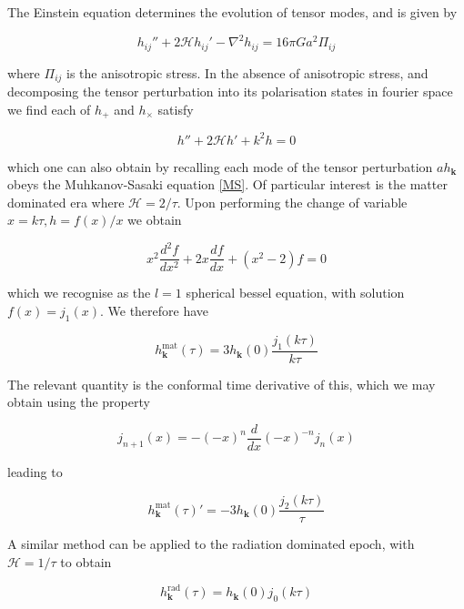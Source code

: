 \documentclass[a4paper,10pt]{article}
\renewcommand{\v}[1]{\mathbf{#1}}
\begin{document}
The Einstein equation determines the evolution of tensor modes, and is given by \cite{Pritchard}

\begin{equation}
h_{ij}''+2\mathcal{H}h_{ij}'-\nabla^2h_{ij} = 16\pi Ga^2\Pi_{ij}
\end{equation}

where $\Pi_{ij}$ is the anisotropic stress. In the absence of anisotropic stress, and decomposing the tensor perturbation into its polarisation states in fourier space we find each of $h_+$ and $h_\times$ satisfy

\begin{equation}
h''+2\mathcal{H}h'+k^2h = 0
\end{equation}

which one can also obtain by recalling each mode of the tensor perturbation $ah_\v{k}$ obeys the Muhkanov-Sasaki equation \ref{MS}.  Of particular interest is the matter dominated era where $\mathcal{H}=2/\tau$. Upon performing the change of variable $x=k\tau,  h=f(x)/x$ we obtain

\begin{equation}
x^2\frac{d^2f}{dx^2}+2x\frac{df}{dx}+(x^2-2)f=0
\end{equation}

which we recognise as the $l=1$ spherical bessel equation, with solution $f(x) = j_1(x)$. We therefore have

\begin{equation}
h^{\text{mat}}_\v{k}(\tau) = 3h_\v{k}(0)\frac{j_1(k\tau)}{k\tau}
\end{equation}

The relevant quantity is the conformal time derivative of this, which we may obtain using the property

\begin{equation}
j_{n+1}(x)=-(-x)^n\frac{d}{dx}(-x)^{-n}j_n(x)
\end{equation}

leading to 

\begin{equation}
h^{\text{mat}}_\v{k}(\tau)' = -3h_\v{k}(0)\frac{j_2(k\tau)}{\tau}
\end{equation}

A similar method can be applied to the radiation dominated epoch, with $\mathcal{H}=1/\tau$ to obtain

\begin{equation}
h^{\text{rad}}_\v{k}(\tau) = h_\v{k}(0)j_0({k\tau})
\end{equation}
\end{document}
